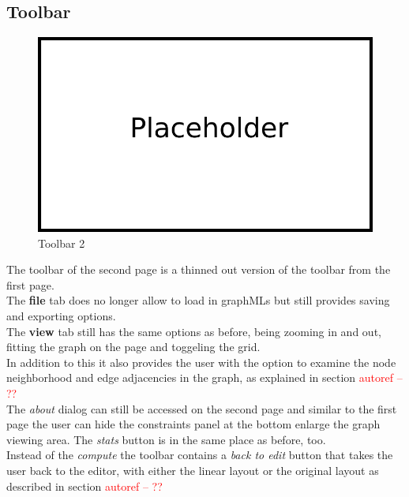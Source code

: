 \subsection{Toolbar}
\begin{figure}[!h]
\begin{center}
\includegraphics[width=1\textwidth]{figures/Platzhalter.png}
\caption{Toolbar 2}
\label{img:plzhltr}
\end{center}
\end{figure}
The toolbar of the second page is a thinned out version of the toolbar from the first page.\\
The \textbf{file} tab does no longer allow to load in graphMLs but still provides saving and exporting options.\\
The \textbf{view} tab still has the same options as before, being zooming in and out, fitting the graph on the page and toggeling the grid.\\
In addition to this it also provides the user with the option to examine the node neighborhood and edge adjacencies in the graph, as explained in section  \textcolor{red}{autoref -- ??}\\
The \textit{about} dialog can still be accessed on the second page and similar to the first page the user can hide the constraints panel at the bottom enlarge the graph viewing area. The \textit{stats} button is in the same place as before, too.\\
Instead of the \textit{compute} the toolbar contains a \textit{back to edit} button that takes the user back to the editor, with either the linear layout or the original layout as described in section \textcolor{red}{ autoref -- ??}\\
